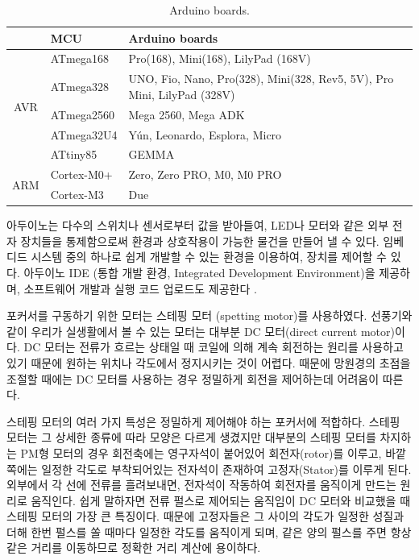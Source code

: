 \begin{table}[ht]
	\caption{Arduino boards. \cite{wiki-arduino}}
	\begin{tabular}{c|l|l}
	\toprule[1pt]
		& MCU        & Arduino boards                            \\ 
		\toprule[1pt]
	
		\multirow{5}{*}{AVR} & ATmega168  & Pro(168), Mini(168), LilyPad (168V)                                     \\
		& ATmega328  & UNO, Fio, Nano, Pro(328), Mini(328, Rev5, 5V), Pro Mini, LilyPad (328V) \\
		& ATmega2560 & Mega 2560, Mega ADK                                                     \\
		& ATmega32U4 & Yún, Leonardo, Esplora, Micro                                           \\
		& ATtiny85   & GEMMA                                                                   \\ 
		\midrule[1pt]
		\multirow{2}{*}{ARM} & Cortex-M0+ & Zero, Zero PRO, M0, M0 PRO                                              \\
		& Cortex-M3  & Due      \\
	\bottomrule[1pt]   
	\end{tabular}
	\label{table:arduino_boards}
\end{table}

아두이노는 다수의 스위치나 센서로부터 값을 받아들여, LED나 모터와 같은 외부 전자 장치들을 통제함으로써 환경과 상호작용이 가능한 물건을 만들어 낼 수 있다. 임베디드 시스템 중의 하나로 쉽게 개발할 수 있는 환경을 이용하여, 장치를 제어할 수 있다. 아두이노 IDE (통합 개발 환경, Integrated Development Environment)을 제공하며, 소프트웨어 개발과 실행 코드 업로드도 제공한다 \cite{wiki-arduino}. 

포커서를 구동하기 위한 모터는 스테핑 모터 (spetting motor)를 사용하였다. 선풍기와 같이 우리가 실생활에서 볼 수 있는 모터는 대부분 DC 모터(direct current motor)이다. DC 모터는 전류가 흐르는 상태일 때 코일에 의해 계속 회전하는 원리를 사용하고 있기 때문에 원하는 위치나 각도에서 정지시키는 것이 어렵다. 때문에 망원경의 초점을 조절할 때에는 DC 모터를 사용하는 경우 정밀하게 회전을 제어하는데 어려움이 따른다. 

스테핑 모터의 여러 가지 특성은 정밀하게 제어해야 하는 포커서에 적합하다. 스테핑 모터는 그 상세한 종류에 따라 모양은 다르게 생겼지만 대부분의 스테핑 모터를 차지하는 PM형 모터의 경우 회전축에는 영구자석이 붙어있어 회전자(rotor)를 이루고, 바깥쪽에는 일정한 각도로 부착되어있는 전자석이 존재하여 고정자(Stator)를 이루게 된다. 외부에서 각 선에 전류를 흘려보내면, 전자석이 작동하여 회전자를 움직이게 만드는 원리로 움직인다. 쉽게 말하자면 전류 펄스로 제어되는 움직임이 DC 모터와 비교했을 때 스테핑 모터의 가장 큰 특징이다. 때문에 고정자들은 그 사이의 각도가 일정한 성질과 더해 한번 펄스를 쏠 때마다 일정한 각도를 움직이게 되며, 같은 양의 펄스를 주면 항상 같은 거리를 이동하므로 정확한 거리 계산에 용이하다.

